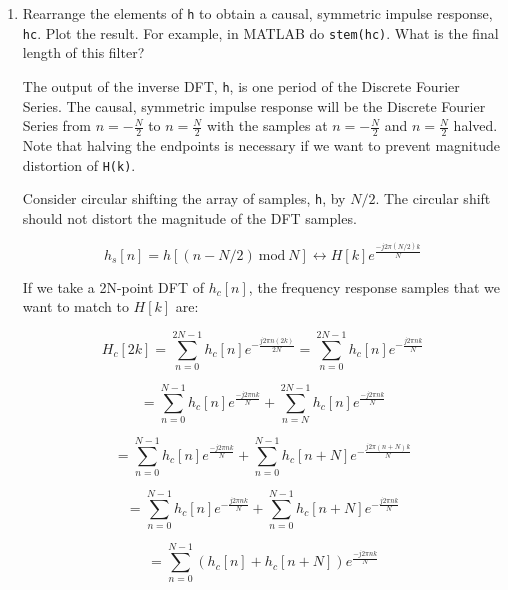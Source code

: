 \documentclass[fleqn]{article}
\begin{document}
\begin{enumerate}
\begin{enumerate}[nolistsep]
			\item Rearrange the elements of \texttt{h} to obtain a causal, symmetric impulse response, \texttt{hc}. Plot the result. For example, in MATLAB do \texttt{stem(hc)}. What is the final length of this filter?
			
			The output of the inverse DFT, \texttt{h}, is one period of the Discrete Fourier Series. The causal, symmetric impulse response will be the Discrete Fourier Series from $n=-\frac{N}{2}$ to $n=\frac{N}{2}$ with the samples at $n=-\frac{N}{2}$ and $n=\frac{N}{2}$ halved. Note that halving the endpoints is necessary if we want to prevent magnitude distortion of \texttt{H(k)}.
			 
			\pagebreak
			Consider circular shifting the array of samples, \texttt{h}, by $N/2$. The circular shift should not distort the magnitude of the DFT samples.
			
			\begin{equation*}
				h_s[n] = h[(n - N/2)\ \text{mod}\ N] \leftrightarrow H[k]e^{\frac{-j{2\pi}(N/2)k}{N}}
			\end{equation*}
			
			If we take a 2N-point DFT of $h_c[n]$, the frequency response samples that we want to match to $H[k]$ are:
			 
			\begin{equation*}
				H_c[2k] = \sum_{n=0}^{2N-1}{h_c[n]e^{-\frac{j2{\pi}n(2k)}{2N}}} = \sum_{n=0}^{2N-1}{h_c[n]e^{-\frac{j2{\pi}nk}{N}}}
			\end{equation*}
			
			\begin{equation*}
				= \sum_{n=0}^{N-1}{h_c[n]e^{\frac{-j2{\pi}nk}{N}}} + \sum_{n=N}^{2N-1}{h_c[n]e^{\frac{-j2{\pi}nk}{N}}}
			\end{equation*}
			
			\begin{equation*}
				 = \sum_{n=0}^{N-1}{h_c[n]e^{\frac{-j2{\pi}nk}{N}}} + \sum_{n=0}^{N-1}{h_c[n+N]e^{-\frac{j2{\pi}(n+N)k}{N}}}
			\end{equation*}
			
			\begin{equation*}
				 = \sum_{n=0}^{N-1}{h_c[n]e^{-\frac{j2{\pi}nk}{N}}} + \sum_{n=0}^{N-1}{h_c[n+N]e^{-\frac{j2{\pi}nk}{N}}}
			\end{equation*}
			
			\begin{equation*}
				 = \sum_{n=0}^{N-1}{(h_c[n] + h_c[n+N])e^{\frac{-j2{\pi}nk}{N}}}
			\end{equation*}
			

\end{enumerate}
\end{enumerate}
\end{document}
